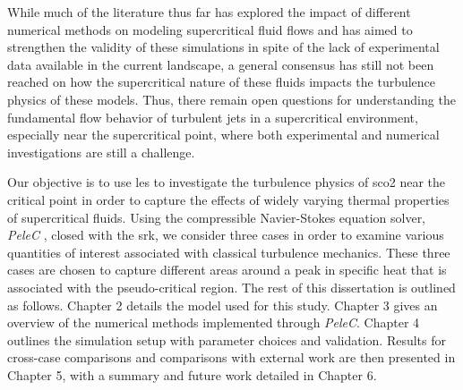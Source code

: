 While much of the literature thus far has explored the impact of different numerical methods on modeling supercritical fluid flows and has aimed to strengthen the validity of these simulations in spite of the lack of experimental data available in the current landscape, a general consensus has still not been reached on how the supercritical nature of these fluids impacts the turbulence physics of these models. Thus, there remain open questions for understanding the fundamental flow behavior of turbulent jets in a supercritical environment, especially near the supercritical point, where both experimental and numerical investigations are still a challenge.

Our objective is to use \gls{les} to investigate the turbulence physics of \gls{sco2} near the critical point in order to capture the effects of widely varying thermal properties of supercritical fluids. Using the compressible Navier-Stokes equation solver, \textit{PeleC} \cite{PeleC1, PeleC2}, closed with the \gls{srk}, we consider three cases in order to examine various quantities of interest associated with classical turbulence mechanics. These three cases are chosen to capture different areas around a peak in specific heat that is associated with the pseudo-critical region. The rest of this dissertation is outlined as follows. Chapter 2 details the model used for this study. Chapter 3 gives an overview of the numerical methods implemented through \textit{PeleC}. Chapter 4 outlines the simulation setup with parameter choices and validation. Results for cross-case comparisons and comparisons with external work are then presented in Chapter 5, with a summary and future work detailed in Chapter 6. 





